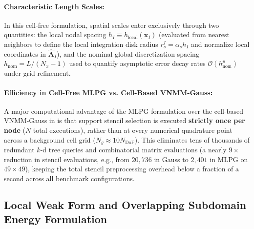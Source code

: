 \documentclass[preprint,12pt]{elsarticle}
\begin{document}
\paragraph{Characteristic Length Scales:}
In this cell-free formulation, spatial scales enter exclusively through two quantities:
the local nodal spacing $h_I \equiv h_{\mathrm{local}}(\mathbf{x}_I)$ (evaluated from nearest neighbors to define the local integration disk radius $r_s^I = \alpha_s h_I$ and normalize local coordinates in $\widehat{\mathbf{A}}_I$), and the nominal global discretization spacing $h_{\mathrm{nom}} = L/(N_x - 1)$ used to quantify asymptotic error decay rates $\mathcal{O}(h_{\mathrm{nom}}^p)$ under grid refinement.

\paragraph{Efficiency in Cell-Free MLPG vs. Cell-Based VNMM-Gauss:}
A major computational advantage of the MLPG formulation over the cell-based VNMM-Gauss in \cite{stable_vnmm2d_2026} is that support stencil selection is executed \textbf{strictly once per node} ($N$ total executions), rather than at every numerical quadrature point across a background cell grid ($N_g \approx 10 N_{\mathrm{DoF}}$). This eliminates tens of thousands of redundant $k$-d tree queries and combinatorial matrix evaluations (a nearly $9\times$ reduction in stencil evaluations, e.g., from $20{,}736$ in Gauss to $2{,}401$ in MLPG on $49\times 49$), keeping the total stencil preprocessing overhead below a fraction of a second across all benchmark configurations.

\subsection{Local Weak Form and Overlapping Subdomain Energy Formulation}
\label{subsec:local_weak_form}
\end{document}
